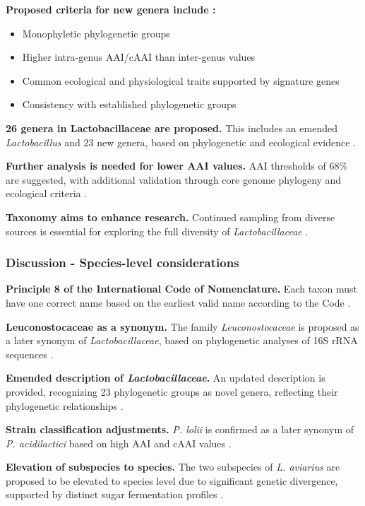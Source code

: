 \textbf{Proposed criteria for new genera include \cite*{L3-TaxNotes}:}
\begin{itemize}
    \item Monophyletic phylogenetic groups
    \item Higher intra-genus AAI/cAAI than inter-genus values
    \item Common ecological and physiological traits supported by signature genes
    \item Consistency with established phylogenetic groups
\end{itemize}

\textbf{26 genera in Lactobacillaceae are proposed.} This includes an emended \textit{Lactobacillus} and 23 new genera, based on phylogenetic and ecological evidence \cite*{L3-TaxNotes}.

\textbf{Further analysis is needed for lower AAI values.} AAI thresholds of 68\% are suggested, with additional validation through core genome phylogeny and ecological criteria \cite*{L3-TaxNotes}.

\textbf{Taxonomy aims to enhance research.} Continued sampling from diverse sources is essential for exploring the full diversity of \textit{Lactobacillaceae} \cite*{L3-TaxNotes}.

\subsubsection{Discussion - Species-level considerations}

\textbf{Principle 8 of the International Code of Nomenclature.} Each taxon must have one correct name based on the earliest valid name according to the Code \cite*{L3-TaxNotes}.

\textbf{Leuconostocaceae as a synonym.} The family \textit{Leuconostocaceae} is proposed as a later synonym of \textit{Lactobacillaceae}, based on phylogenetic analyses of 16S rRNA sequences \cite*{L3-TaxNotes}.

\textbf{Emended description of \textit{Lactobacillaceae}.} An updated description is provided, recognizing 23 phylogenetic groups as novel genera, reflecting their phylogenetic relationships \cite*{L3-TaxNotes}.

\textbf{Strain classification adjustments.} \textit{P. lolii} is confirmed as a later synonym of \textit{P. acidilactici} based on high AAI and cAAI values \cite*{L3-TaxNotes}.

\textbf{Elevation of subspecies to species.} The two subspecies of \textit{L. aviarius} are proposed to be elevated to species level due to significant genetic divergence, supported by distinct sugar fermentation profiles \cite*{L3-TaxNotes}.

